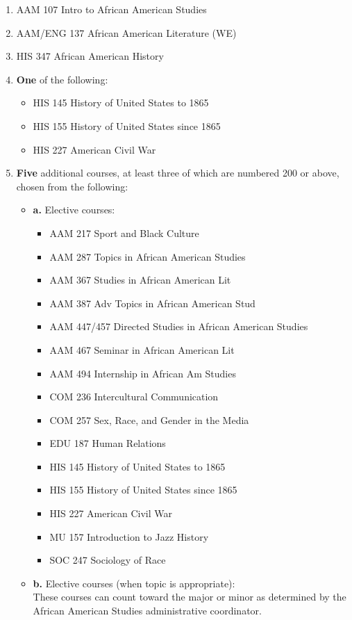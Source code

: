 \documentclass[
  letterpaper,
]{scrbook}
\providecommand{\tightlist}{%
  \setlength{\itemsep}{0pt}\setlength{\parskip}{0pt}}
\begin{document}
\begin{enumerate}
\def\labelenumi{\arabic{enumi}.}
\tightlist
\item
  AAM 107 Intro to African American Studies
\item
  AAM/ENG 137 African American Literature (WE)
\item
  HIS 347 African American History
\item
  \textbf{One} of the following:

  \begin{itemize}
  \tightlist
  \item
    HIS 145 History of United States to 1865
  \item
    HIS 155 History of United States since 1865
  \item
    HIS 227 American Civil War
  \end{itemize}
\item
  \textbf{Five} additional courses, at least three of which are numbered
  200 or above, chosen from the following:

  \begin{itemize}
  \item
    \textbf{a.} Elective courses:

    \begin{itemize}
    \tightlist
    \item
      AAM 217 Sport and Black Culture
    \item
      AAM 287 Topics in African American Studies
    \item
      AAM 367 Studies in African American Lit
    \item
      AAM 387 Adv Topics in African American Stud
    \item
      AAM 447/457 Directed Studies in African American Studies
    \item
      AAM 467 Seminar in African American Lit
    \item
      AAM 494 Internship in African Am Studies
    \item
      COM 236 Intercultural Communication
    \item
      COM 257 Sex, Race, and Gender in the Media
    \item
      EDU 187 Human Relations
    \item
      HIS 145 History of United States to 1865
    \item
      HIS 155 History of United States since 1865
    \item
      HIS 227 American Civil War
    \item
      MU 157 Introduction to Jazz History
    \item
      SOC 247 Sociology of Race
    \end{itemize}
  \item
    \textbf{b.} Elective courses (when topic is appropriate): ~\\
    These courses can count toward the major or minor as determined by
    the African American Studies administrative coordinator.


\end{itemize}
\end{enumerate}
\end{document}
